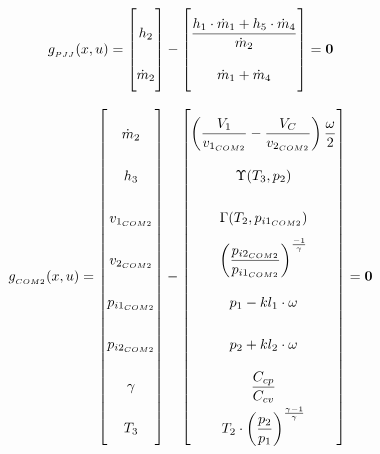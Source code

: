 

\begin{equation} \label{eq:Gpjj}\renewcommand{\arraystretch}{2.5}
	g_{_{PJJ}}(x,u) =  \begin{bmatrix}
		h_{2}				\\ %
		\dot{m}_{2}			\\ %
	\end{bmatrix}
	-
	\begin{bmatrix}
		\dfrac{h_{1} \cdot \dot{m}_{1} + h_{5} \cdot \dot{m}_{4}}{ \dot{m}_{2} } \\ 	%
		\dot{m}_{1} + \dot{m}_{4} \\													%
	\end{bmatrix}
	=\textbf{0}
\end{equation}


\begin{equation} \label{eq:Gcs2}\renewcommand{\arraystretch}{2.5}
	g_{_{COM2}}(x,u) =  \begin{bmatrix}
		\dot{m}_2     \\ %
		h_{3}         \\ %
		v_{1_{COM2}}  \\ %
		v_{2_{COM2}}  \\ %
		p_{i1_{COM2}} \\ %
		p_{i2_{COM2}} \\ %
		\gamma        \\ %
		T_{3}         \\ %
	\end{bmatrix}
	-
	\begin{bmatrix}
		\left(\dfrac{V_1}{v_{1_{COM2}}} - \dfrac{V_C}{v_{2_{COM2}}}\right) \dfrac{\omega}{2} \\			%
		\Upsilon(T_{3}, p_{2})		\\													%
		\Gamma(T_{2},p_{i1_{COM2}}) \\													%
		\left(\dfrac{p_{i2_{COM2}}}{p_{i1_{COM2}}}\right)^{\frac{-1}{\gamma}} \\		%
		p_{1} - kl_1 \cdot \omega \\													%
		p_{2} + kl_2 \cdot \omega \\													%
		\dfrac{C_{cp}}{C_{cv}} \\														%
		T_{2}\cdot \left(\dfrac{p_{2}}{p_{1}}\right)^{\frac{\gamma-1}{\gamma}}	\\		%
	\end{bmatrix}
	=\textbf{0}
\end{equation}


